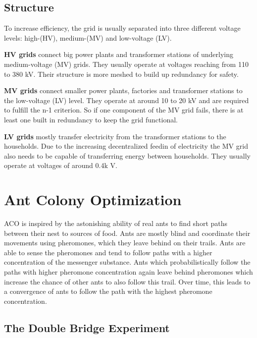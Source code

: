 \subsection{Structure}
To increase efficiency, the grid is usually separated into three different voltage levels: high-(HV), medium-(MV) and low-voltage (LV).

\textbf{HV grids} connect big power plants and transformer stations of underlying medium-voltage (MV) grids. They usually operate at voltages reaching from 110 to 380 kV. Their structure is more meshed to build up redundancy for safety.

\textbf{MV grids} connect smaller power plants, factories and transformer stations to the low-voltage (LV) level. They operate at around 10 to 20 kV and are required to fulfill the n-1 criterion. So if one component of the MV grid fails, there is at least one built in redundancy to keep the grid functional.

\textbf{LV grids} mostly transfer electricity from the transformer stations to the households. Due to the increasing decentralized feedin of electricity the MV grid also needs to be capable of transferring energy between households. They usually operate at voltages of around 0.4k V.




\section{Ant Colony Optimization}
ACO is inspired by the astonishing ability of real ants to find short paths between their nest to sources of food. Ants are mostly blind and coordinate their movements using pheromones, which they leave behind on their trails. Ants are able to sense the pheromones and tend to follow paths with a higher concentration of the messenger substance. Ants which probabilistically follow the paths with higher pheromone concentration again leave behind pheromones which increase the chance of other ants to also follow this trail. Over time, this leads to a convergence of ants to follow the path with the highest pheromone concentration.

\subsection{The Double Bridge Experiment}

